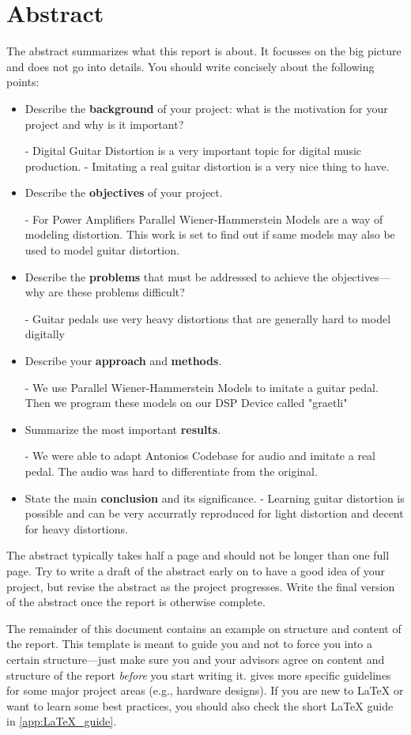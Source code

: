 \chapter*{Abstract}

The abstract summarizes what this report is about.
It focusses on the big picture and does not go into details.
You should write concisely about the following points:

\begin{itemize}
  \item Describe the \textbf{background} of your project: what is the motivation for your project and why is it important?
  
- Digital Guitar Distortion is a very important topic for digital music production. 
- Imitating a real guitar distortion is a very nice thing to have. 

  \item Describe the \textbf{objectives} of your project.
  
- For Power Amplifiers Parallel Wiener-Hammerstein Models are a way of modeling distortion. This work is set to find out if same models may also be used to model guitar distortion.
  \item Describe the \textbf{problems} that must be addressed to achieve the objectives---why are these problems difficult?

  - Guitar pedals use very heavy distortions that are generally hard to model digitally
  \item Describe your \textbf{approach} and \textbf{methods}.

  - We use Parallel Wiener-Hammerstein Models to imitate a guitar pedal. Then we program these models on our DSP Device called "graetli"
  \item Summarize the most important \textbf{results}.

    - We were able to adapt Antonios Codebase for audio and imitate a real pedal. The audio was hard to differentiate from the original. 

  \item State the main \textbf{conclusion} and its significance.
  - Learning guitar distortion is possible and can be very accurratly reproduced for light distortion and decent for heavy distortions. 
\end{itemize}

The abstract typically takes half a page and should not be longer than one full page.
Try to write a draft of the abstract early on to have a good idea of your project, but revise the abstract as the project progresses.
Write the final version of the abstract once the report is otherwise complete.

The remainder of this document contains an example on structure and content of the report.
This template is meant to guide you and not to force you into a certain structure---just make sure you and your advisors agree on content and structure of the report \emph{before} you start writing it.
 gives more specific guidelines for some major project areas (e.g., hardware designs).
If you are new to \LaTeX{} or want to learn some best practices, you should also check the short \LaTeX{} guide in \cref{app:LaTeX_guide}.
